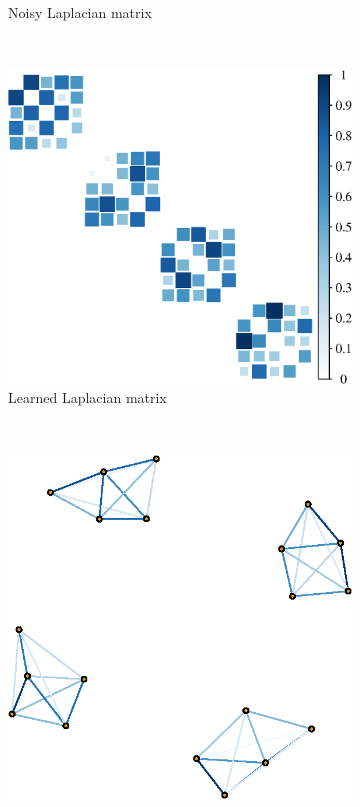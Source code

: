 \begin{figure}[!htb]
\begin{subfigure}[b]{0.3\textwidth}
        \caption{Noisy Laplacian matrix}
    \end{subfigure}
    ~ %
    \begin{subfigure}[b]{0.3\textwidth}
        \includegraphics[width=\textwidth]{block-diagonal/latex/figures/est_mat.eps}
        \caption{Learned Laplacian matrix}
    \end{subfigure}
        \\
    \begin{subfigure}[b]{0.3\textwidth}
        \includegraphics[width=\textwidth]{block-diagonal/latex/figures/true_graph.eps}

\end{subfigure}
\end{figure}
